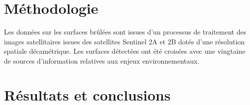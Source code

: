 \documentclass[
  11pt,
  letterpaper,
]{scrreprt}
\begin{document}
\section*{Méthodologie}\label{muxe9thodologie}


Les données sur les surfaces brûlées sont issues d'un processus de
traitement des images satellitaires issues des satellites Sentinel 2A et
2B dotés d'une résolution spatiale décamétrique. Les surfaces détectées
ont été croisées avec une vingtaine de sources d'information relatives
aux enjeux environnementaux.

\section*{Résultats et conclusions}\label{ruxe9sultats-et-conclusions}

\end{document}

